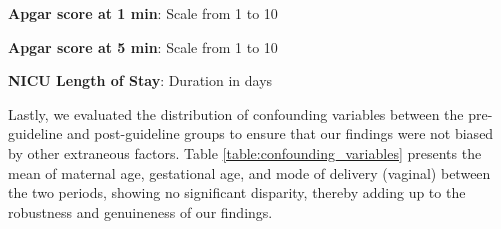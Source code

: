 \documentclass[11pt]{article}
\begin{document}
\begin{table}[h]
\caption{Test of association between the change in treatment policy and neonatal outcomes}
\label{table:neonatal_outcomes}
\begin{threeparttable}
\renewcommand{\TPTminimum}{\linewidth}
\begin{tablenotes}
\footnotesize
\item \textbf{Apgar score at 1 min}: Scale from 1 to 10
\item \textbf{Apgar score at 5 min}: Scale from 1 to 10
\item \textbf{NICU Length of Stay}: Duration in days
\end{tablenotes}
\end{threeparttable}
\end{table}


Lastly, we evaluated the distribution of confounding variables between the pre-guideline and post-guideline groups to ensure that our findings were not biased by other extraneous factors. Table \ref{table:confounding_variables} presents the mean of maternal age, gestational age, and mode of delivery (vaginal) between the two periods, showing no significant disparity, thereby adding up to the robustness and genuineness of our findings.
\end{document}
